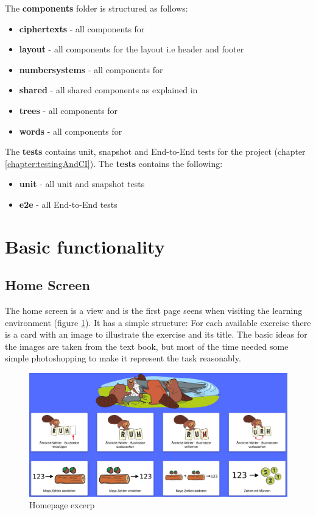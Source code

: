 The \textbf{components} folder is structured as follows:

\begin{itemize}
    \item \textbf{ciphertexts} - all components for 
    \item \textbf{layout} - all components for the layout i.e header and footer
    \item \textbf{numbersystems} - all components for 
    \item \textbf{shared} - all shared components as explained in 
    \item \textbf{trees} - all components for 
    \item \textbf{words} - all components for 
\end{itemize}

The \textbf{tests} contains unit, snapshot and End-to-End tests for the project (chapter \ref{chapter:testingAndCI}). The \textbf{tests} contains the following:

\begin{itemize}
    \item \textbf{unit} - all unit and snapshot tests
    \item \textbf{e2e} - all End-to-End tests
\end{itemize}

\section{Basic functionality}
\label{section:basicFunctionality}

\subsection{Home Screen}
The home screen is a view and is the first page seens when visiting the learning environment (figure \ref{fig:homepage}). It has a simple structure: For each available exercise there is a card with an image to illustrate the exercise and its title. The basic ideas for the images are taken from the text book, but most of the time needed some simple photoshopping to make it represent the task reasonably.

\begin{figure} 
    \centering
    \includegraphics[width=1.0 \columnwidth]{figures/homepage.png}
    \caption{Homepage excerp} 
    \label{fig:homepage} 
\end{figure}


